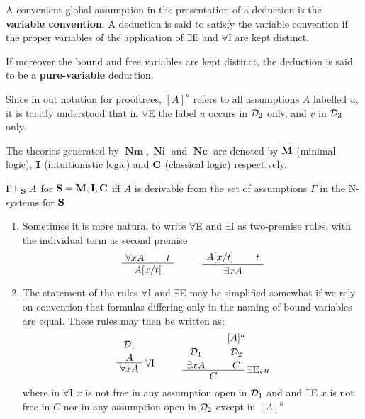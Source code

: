 \documentclass[11pt]{article}
\DeclareMathOperator{\Nm}{\textbf{Nm}}
\DeclareMathOperator{\Ni}{\textbf{Ni}}
\DeclareMathOperator{\Nc}{\textbf{Nc}}
\begin{document}
\begin{definition}[]
A convenient global assumption in the presentation of a deduction is the 
\textbf{variable convention}. A deduction is said to satisfy the variable convention
if the proper variables of the application of \(\exists\)E and \(\forall\)I
are kept distinct.

If moreover the bound and free variables are kept distinct, the deduction is
said to be a \textbf{pure-variable} deduction.
\end{definition}

\begin{remark}
Since in out notation for prooftrees, \([A]^u\) refers to all assumptions
\(A\) labelled \(u\), it is tacitly understood that in \(\vee\)E the label \(u\)
occurs in \(\mathcal{D}_2\) only, and \(v\) in \(\mathcal{D}_3\) only.
\end{remark}

\begin{definition}[]
The theories generated by \(\Nm,\Ni\) and \(\Nc\) are denoted by \(\operatorname{\textbf{M}}\) (minimal
logic), \(\operatorname{\textbf{I}}\) (intuitionistic logic) and \(\operatorname{\textbf{C}}\) (classical logic)
respectively.

\(\Gamma\vdash_{\operatorname{\textbf{S}}}A\) for \(\operatorname{\textbf{S}}=\operatorname{\textbf{M}},\operatorname{\textbf{I}},\operatorname{\textbf{C}}\) iff \(A\) is derivable from the set
of assumptions \(\Gamma\) in the N-systems for \(\operatorname{\textbf{S}}\)
\end{definition}

\begin{remark}
\begin{enumerate}
\item Sometimes it is more natural to write \(\forall\)E and \(\exists\)I as
two-premise rules, with the individual term as second premise
\begin{align*}
\AxiomC{$\forall xA$}
\AxiomC{$t$}
\BinaryInfC{$A[x/t]$}
\DisplayProof\hspace{1cm}
\AxiomC{$A[x/t]$}
\AxiomC{$t$}
\BinaryInfC{$\exists xA$}
\DisplayProof
\end{align*}
\item The statement of the rules \(\forall\)I and \(\exists\)E may be simplified
somewhat if we rely on convention that formulas differing only in the
naming of bound variables are equal. These rules may then be written as:
\begin{gather*}
\AxiomC{$\cald_1$}
\noLine\UnaryInfC{$A$}\RightLabel{$\forall$I}
\UnaryInfC{$\forall xA$}\DisplayProof\hspace{1cm}
\AxiomC{$\cald_1$}
\noLine\UnaryInfC{$\exists xA$}
\AxiomC{$[A]^u$}\noLine\UnaryInfC{$\cald_2$}\noLine
\UnaryInfC{$C$}\RightLabel{$\exists\text{E},u$}
\BinaryInfC{$C$}\DisplayProof
\end{gather*}
where in \(\forall\)I \(x\) is not free in any assumption open in \(\mathcal{D}_1\)
and and \(\exists\)E \(x\) is not free in \(C\) nor in any assumption open in
\(\mathcal{D}_2\) except in \([A]^u\)
\end{enumerate}
\end{remark}
\end{document}
